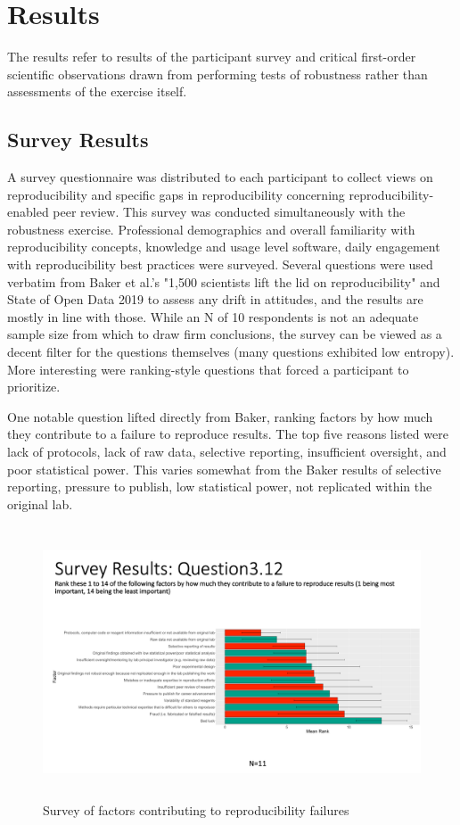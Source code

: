 \documentclass{drexelthesis}
\begin{document}
\section{Results}

The results refer to results of the participant survey and critical first-order scientific observations drawn from performing tests of robustness rather than assessments of the exercise itself.

\subsection{Survey Results}

A survey questionnaire was distributed to each participant to collect views on reproducibility and specific gaps in reproducibility concerning reproducibility-enabled peer review. This survey was conducted simultaneously with the robustness exercise. Professional demographics and overall familiarity with reproducibility concepts, knowledge and usage level software, daily engagement with reproducibility best practices were surveyed. Several questions were used verbatim from Baker et al.'s "1,500 scientists lift the lid on reproducibility" and State of Open Data 2019\cite{Digital_Science2019-iu} to assess any drift in attitudes, and the results are mostly in line with those. While an N of 10 respondents is not an adequate sample size from which to draw firm conclusions, the survey can be viewed as a decent filter for the questions themselves (many questions exhibited low entropy). More interesting were ranking-style questions that forced a participant to prioritize.

One notable question lifted directly from Baker, ranking factors by how much they contribute to a failure to reproduce results. The top five reasons listed were lack of protocols, lack of raw data, selective reporting, insufficient oversight, and poor statistical power. This varies somewhat from the Baker results of selective reporting, pressure to publish, low statistical power, not replicated within the original lab.


\begin{figure}[h!]
	\centering
	\includegraphics[width=13.76cm,height=8.08cm]{./images/surveyfactors.png}
	\caption{Survey of factors contributing to reproducibility failures}
	\label{surveyfactors}
\end{figure}
\end{document}
